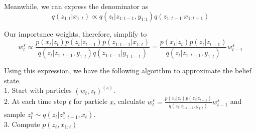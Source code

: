 \documentclass{article}
\begin{document}
Meanwhile, we can express the denominator as
\[q(z_{1:t}|x_{1:t}) \propto q(z_t|z_{1:t-1},y_{1:t})q(z_{1:t-1}|x_{1:t-1})\]

Our importance weights, therefore, simplify to
\[w_t^s \propto \frac{p(x_t|z_t)p(z_t|z_{t-1})p(z_{1:t-1}|x_{1:t})}{q(z_t|z_{1:t-1},y_{1:t})q(z_{1:t-1}|y_{1:t-1})} = \frac{p(x_t|z_t)p(z_t|z_{t-1})}{q(z_t|z_{1:t-1},y_{1:t})}w_{t-1}^s\]

Using this expression, we have the following algorithm to approximate the belief state. \\
1. Start with particles $(w_t,z_t)^{(s)}$. \\
2. At each time step $t$ for particle $x$, calculate $w_t^s = \frac{p(x_t|z_t)p(z_t|z_{t-1})}{q(z_t|z_{1:t-1},y_{1:t})}w_{t-1}^s$ and sample $z_t^s \sim q(z_t|z^s_{1:t-1},x_t)$. \\
3. Compute $p(z_t,x_{1:t})$
\end{document}

